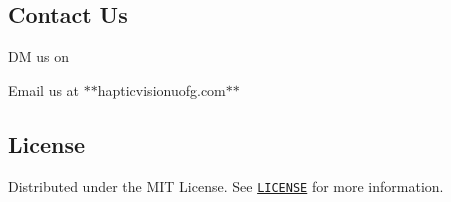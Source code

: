 \subsection*{Contact Us}


\begin{DoxyItemize}
\item DM us on \href{https://www.instagram.com/hapticvision_/}{\tt }
\item Email us at $\ast$$\ast$hapticvisionuofg.com$\ast$$\ast$
\end{DoxyItemize}

\subsection*{License}

Distributed under the M\+IT License. See \href{https://github.com/Haptic-Vision/haptic_vision/blob/main/LICENSE}{\tt L\+I\+C\+E\+N\+SE} for more information. 